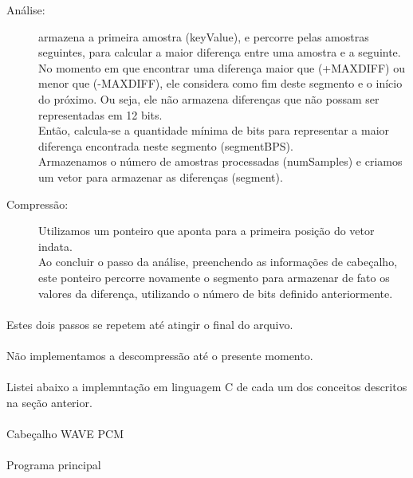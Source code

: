 \documentclass[a4paper,12pt]{article}
\begin{document}
\begin{description}
\item[Análise:] armazena a primeira amostra (keyValue), e percorre pelas amostras seguintes, para calcular a maior diferença entre uma amostra e a seguinte.\\
No momento em que encontrar uma diferença maior que (+MAXDIFF) ou menor que (-MAXDIFF), ele considera como fim deste segmento e o início do próximo. Ou seja, ele não armazena diferenças que não possam ser representadas em 12 bits.\\
Então, calcula-se a quantidade mínima de bits para representar a maior diferença encontrada neste segmento (segmentBPS).\\
Armazenamos o número de amostras processadas (numSamples) e criamos um vetor para armazenar as diferenças (segment).
\item[Compressão:] Utilizamos um ponteiro que aponta para a primeira posição do vetor indata.\\
Ao concluir o passo da análise, preenchendo as informações de cabeçalho, este ponteiro percorre novamente o segmento para armazenar de fato os valores da diferença, utilizando o número de bits definido anteriormente.
\end{description}
\paragraph{}
Estes dois passos se repetem até atingir o final do arquivo.


\paragraph{}
Não implementamos a descompressão até o presente momento.

\paragraph{}
Listei abaixo a implemntação em linguagem C de cada um dos conceitos descritos na seção anterior.

\paragraph{}
Cabeçalho WAVE PCM


\paragraph{}
Programa principal

\end{document}
